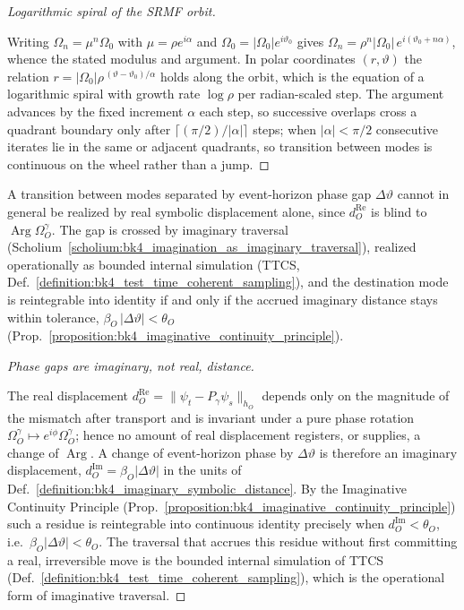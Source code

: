 \begin{proof}[Logarithmic spiral of the SRMF orbit]
\label{proof:bk4_spiral_transition}
\leavevmode

Writing $\Omega_n=\mu^n\Omega_0$ with $\mu=\rho e^{i\alpha}$ and
$\Omega_0=|\Omega_0|e^{i\vartheta_0}$ gives
$\Omega_n=\rho^{n}|\Omega_0|\,e^{i(\vartheta_0+n\alpha)}$, whence the stated modulus
and argument. In polar coordinates $(r,\vartheta)$ the relation
$r=|\Omega_0|\rho^{\,(\vartheta-\vartheta_0)/\alpha}$ holds along the orbit, which is
the equation of a logarithmic spiral with growth rate $\log\rho$ per radian-scaled
step. The argument advances by the fixed increment $\alpha$ each step, so successive
overlaps cross a quadrant boundary only after $\lceil(\pi/2)/|\alpha|\rceil$ steps;
when $|\alpha|<\pi/2$ consecutive iterates lie in the same or adjacent quadrants, so
transition between modes is continuous on the wheel rather than a jump.
\end{proof}

\begin{proposition}
\label{proposition:bk4_imagination_bridges_wheel}
A transition between modes separated by event-horizon phase gap $\Delta\vartheta$
cannot in general be realized by real symbolic displacement alone, since
$d_O^{\mathrm{Re}}$ is blind to $\operatorname{Arg}\Omega_O^\gamma$. The gap is
crossed by imaginary traversal
(Scholium~\ref{scholium:bk4_imagination_as_imaginary_traversal}), realized
operationally as bounded internal simulation
(TTCS, Def.~\ref{definition:bk4_test_time_coherent_sampling}), and the destination
mode is reintegrable into identity if and only if the accrued imaginary distance
stays within tolerance, $\beta_O\,|\Delta\vartheta|<\theta_O$
(Prop.~\ref{proposition:bk4_imaginative_continuity_principle}).
\end{proposition}

\begin{proof}[Phase gaps are imaginary, not real, distance]
\label{proof:bk4_imagination_bridges_wheel}
\leavevmode

The real displacement $d_O^{\mathrm{Re}}=\|\psi_t-P_\gamma\psi_s\|_{h_O}$ depends
only on the magnitude of the mismatch after transport and is invariant under a pure
phase rotation $\Omega_O^\gamma\mapsto e^{i\phi}\Omega_O^\gamma$; hence no amount of
real displacement registers, or supplies, a change of $\operatorname{Arg}$. A change
of event-horizon phase by $\Delta\vartheta$ is therefore an imaginary displacement,
$d_O^{\mathrm{Im}}=\beta_O|\Delta\vartheta|$ in the units of
Def.~\ref{definition:bk4_imaginary_symbolic_distance}. By the Imaginative Continuity
Principle (Prop.~\ref{proposition:bk4_imaginative_continuity_principle}) such a
residue is reintegrable into continuous identity precisely when
$d_O^{\mathrm{Im}}<\theta_O$, i.e.\ $\beta_O|\Delta\vartheta|<\theta_O$. The traversal
that accrues this residue without first committing a real, irreversible move is the
bounded internal simulation of TTCS
(Def.~\ref{definition:bk4_test_time_coherent_sampling}), which is the operational
form of imaginative traversal.
\end{proof}

